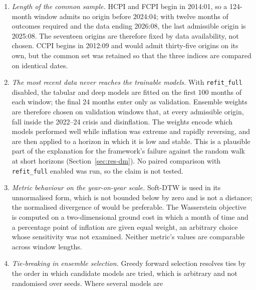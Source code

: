 \documentclass[12pt]{article}
\begin{document}
\begin{enumerate}
          of the foundation models cannot be separated from possible
          look-ahead, and any part of the reported accuracy that rests on them
          is not established as genuine out-of-sample performance.
    \item \emph{Length of the common sample.} HCPI and FCPI begin in 2014:01,
          so a 124-month window admits no origin before 2024:04; with twelve
          months of outcomes required and the data ending 2026:08, the last
          admissible origin is 2025:08. The seventeen origins are therefore
          fixed by data availability, not chosen. CCPI begins in 2012:09 and
          would admit thirty-five origins on its own, but the common set was
          retained so that the three indices are compared on identical dates.
    \item \emph{The most recent data never reaches the trainable models.}
          With \texttt{refit\_full} disabled, the tabular and deep models are
          fitted on the first 100 months of each window; the final 24 months
          enter only as validation. Ensemble weights are therefore chosen on
          validation windows that, at every admissible origin, fall inside the
          2022--24 crisis and disinflation. The weights encode which models
          performed well while inflation was extreme and rapidly reversing, and
          are then applied to a horizon in which it is low and stable. This is a
          plausible part of the explanation for the framework's failure against
          the random walk at short horizons
          (Section~\ref{sec:res-dm}). No paired comparison with
          \texttt{refit\_full} enabled was run, so the claim is not tested.
    \item \emph{Metric behaviour on the year-on-year scale.} Soft-DTW is used
          in its unnormalised form, which is not bounded below by zero and is
          not a distance; the normalised divergence of
          \citet{blondel2021} would be preferable. The Wasserstein
          objective is computed on a two-dimensional ground cost in which a
          month of time and a percentage point of inflation are given equal
          weight, an arbitrary choice whose sensitivity was not examined.
          Neither metric's values are comparable across window lengths.
    \item \emph{Tie-breaking in ensemble selection.} Greedy forward selection
          resolves ties by the order in which candidate models are tried, which
          is arbitrary and not randomised over seeds. Where several models are

\end{enumerate}
\end{document}
